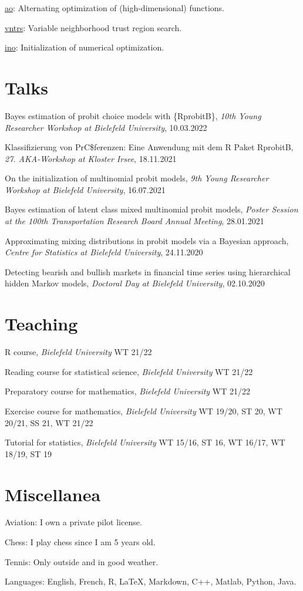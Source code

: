 \documentclass[11pt,]{article}
\begin{document}
\href{https://loelschlaeger.de/ao/}{ao}: Alternating optimization of
(high-dimensional) functions.

\href{https://loelschlaeger.de/vntrs/}{vntrs}: Variable neighborhood
trust region search.

\href{https://loelschlaeger.de/ino/}{ino}: Initialization of numerical
optimization.

\section{Talks}\label{talks}

Bayes estimation of probit choice models with \{RprobitB\}, \emph{10th
Young Researcher Workshop at Bielefeld University}, 10.03.2022

Klassifizierung von PrC\$ferenzen: Eine Anwendung mit dem R Paket
RprobitB, \emph{27. AKA-Workshop at Kloster Irsee}, 18.11.2021

On the initialization of multinomial probit models, \emph{9th Young
Researcher Workshop at Bielefeld University}, 16.07.2021

Bayes estimation of latent class mixed multinomial probit models,
\emph{Poster Session at the 100th Transportation Research Board Annual
Meeting}, 28.01.2021

Approximating mixing distributions in probit models via a Bayesian
approach, \emph{Centre for Statistics at Bielefeld University},
24.11.2020

Detecting bearish and bullish markets in financial time series using
hierarchical hidden Markov models, \emph{Doctoral Day at Bielefeld
University}, 02.10.2020

\section{Teaching}\label{teaching}

R course, \emph{Bielefeld University} \hfill WT 21/22

Reading course for statistical science, \emph{Bielefeld University}
\hfill WT 21/22

Preparatory course for mathematics, \emph{Bielefeld University}
\hfill WT 21/22

Exercise course for mathematics, \emph{Bielefeld University} \hfill WT
19/20, ST 20, WT 20/21, SS 21, WT 21/22

Tutorial for statistics, \emph{Bielefeld University} \hfill WT 15/16, ST
16, WT 16/17, WT 18/19, ST 19

\section{Miscellanea}\label{miscellanea}

Aviation: I own a private pilot license.

Chess: I play chess since I am 5 years old.

Tennis: Only outside and in good weather.

Languages: English, French, R, LaTeX, Markdown, C++, Matlab, Python,
Java.
\end{document}
